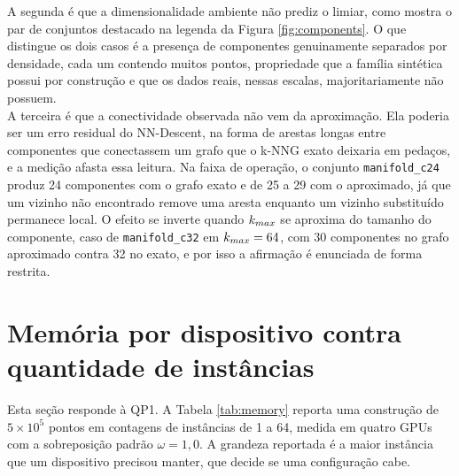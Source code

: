 A segunda é que a dimensionalidade ambiente não prediz o limiar, como mostra o par de conjuntos destacado na legenda da Figura \ref{fig:components}. O que distingue os dois casos é a presença de componentes genuinamente separados por densidade, cada um contendo muitos pontos, propriedade que a família sintética possui por construção e que os dados reais, nessas escalas, majoritariamente não possuem.\\

A terceira é que a conectividade observada não vem da aproximação. Ela poderia ser um erro residual do NN-Descent, na forma de arestas longas entre componentes que conectassem um grafo que o \ac{k-NNG} exato deixaria em pedaços, e a medição afasta essa leitura. Na faixa de operação, o conjunto \texttt{manifold\_c24} produz 24 componentes com o grafo exato e de 25 a 29 com o aproximado, já que um vizinho não encontrado remove uma aresta enquanto um vizinho substituído permanece local. O efeito se inverte quando $k_{max}$ se aproxima do tamanho do componente, caso de \texttt{manifold\_c32} em $k_{max} = 64$, com 30 componentes no grafo aproximado contra 32 no exato, e por isso a afirmação é enunciada de forma restrita.\\

\section{Memória por dispositivo contra quantidade de instâncias\label{sec:res-memory}}

Esta seção responde à QP1. A Tabela \ref{tab:memory} reporta uma construção de $5 \times 10^5$ pontos em contagens de instâncias de 1 a 64, medida em quatro \ac{GPU}s com a sobreposição padrão $\omega = 1{,}0$. A grandeza reportada é a maior instância que um dispositivo precisou manter, que decide se uma configuração cabe.\\

